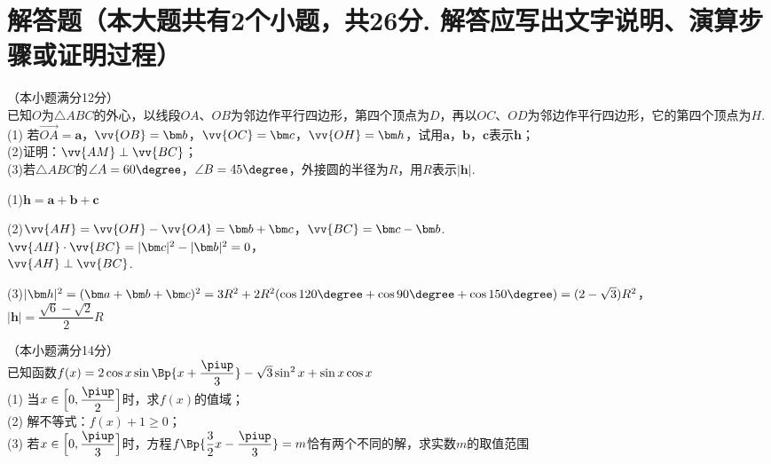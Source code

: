 \section{解答题（本大题共有2个小题，共26分. 解答应写出文字说明、演算步骤或证明过程）}
  \item
    （本小题满分12分）\\
    已知$O$为$\triangle{ABC}$的外心，以线段$OA$、$OB$为邻边作平行四边形，第四个顶点为$D$，再以$OC$、$OD$为邻边作平行四边形，它的第四个顶点为$H$.\\
    (1) 若$\vec{OA}=\bm a$，$\vv{OB}=\bm b$，$\vv{OC}=\bm c$，$\vv{OH}=\bm h$，试用$\bm a$，$\bm b$，$\bm c$表示$\bm h$；\\
    (2)证明：$\vv{AM}\perp\vv{BC}$；\\
    (3)若$\triangle{ABC}$的$\angle{A}=60\degree$，$\angle{B}=45\degree$，外接圆的半径为$R$，用$R$表示$|\bm h|$.
    \begin{answer}
      (1)$\bm h=\bm a+\bm b+\bm c$\par
      (2)\because $\vv{AH}=\vv{OH}-\vv{OA}=\bm b+\bm c$，$\vv{BC}=\bm c-\bm b$.\\
         \therefore $\vv{AH}\cdot\vv{BC}=|\bm c|^2-|\bm b|^2=0$，\\
         \therefore $\vv{AH}\perp\vv{BC}$.\par
      (3)\because$|\bm h|^2=(\bm a+\bm b+\bm c)^2=3R^2+2R^2(\cos120\degree+\cos90\degree+\cos150\degree)=(2-\sqrt3)R^2$，\\
         \therefore $|\bm h|=\dfrac{\sqrt6-\sqrt2}2 R$
    \end{answer}
  \vspace{12em}
  \item
    （本小题满分14分）\\
    已知函数$f(x)=2\cos x\sin\Bp{x+\dfrac{\piup}3}-\sqrt3\sin^2x+\sin x\cos x$\\
    (1) 当$x\in\Bigl[0,\dfrac{\piup}2\Bigr]$时，求$f(x)$的值域；\\
    (2) 解不等式：$f(x)+1\geq 0$；\\
    (3) 若$x\in\Bigl[0,\dfrac{\piup}3\Bigr]$时，方程$f\Bp{\dfrac32x-\dfrac{\piup}3}=m$恰有两个不同的解，求实数$m$的取值范围
